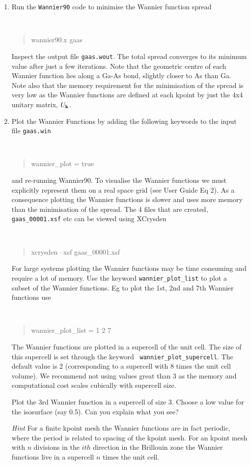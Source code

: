 \documentclass[a4paper,11pt,twoside]{article}
\begin{document}
\begin{enumerate}
\item Run the {\tt Wannier90} code to minimise the Wannier function spread
{\tt
\begin{quote}
wannier90.x gaas
\end{quote} }
Inspect the output file {\tt gaas.wout}. The total spread converges to its
minimum value after just a few iterations. Note that the geometric centre of
each Wannier function lies along a Ga-As bond, slightly closer to As
than Ga. Note also that the memory requirement for the minimisation of
the spread is very low as the Wannier functions are defined at each
kpoint by just the 4x4 unitary matrix, $U_{{\bf k}}$. 
\item Plot the Wannier Functions by adding the following keywords to the input file {\tt gaas.win}
{\tt
\begin{quote}
wannier\_plot = true
\end{quote} }
and re-running Wannier90. To visualise the Wannier functions we must explicitly represent them on
a real space grid (see User Guide Eq 2). As a consequence plotting the
Wannier functions is slower and uses more memory than the minimisation
of the spread. The 4 files that are created, {\tt gaas\_00001.xsf} etc can
be viewed using XCrysden 
{\tt
\begin{quote}
xcrysden --xsf gaas\_00001.xsf
\end{quote} }

For large systems plotting the Wannier functions may be time consuming
and require a lot of memory. Use the keyword {\tt wannier\_plot\_list}
to plot a subset of the Wannier functions. Eg to plot the 1st, 2nd and
7th Wannier functions use 
{\tt
\begin{quote}
wannier\_plot\_list = 1 2 7
\end{quote} }
The Wannier functions are plotted in a supercell of the unit cell. The
size of this supercell is set through the keyword {\tt
  wannier\_plot\_supercell}. The default value is 2 (corresponding to a
supercell with 8 times the unit cell volume). We recommend not using
values great than 3 as the memory and computational cost scales
cubically with  supercell size.  

Plot the 3rd Wannier function in a supercell of size 3. Choose a low
value for the isosurface (say 0.5). Can you explain what you see? 


{\it Hint} For a finite kpoint mesh the Wannier functions are in fact
periodic, where the period is related to spacing of the kpoint mesh. For
an kpoint mesh with $n$ divisions in the $ith$ direction in the
Brillouin zone the Wannier functions live in a supercell $n$ times the
unit cell. 
\end{enumerate}
\end{document}
